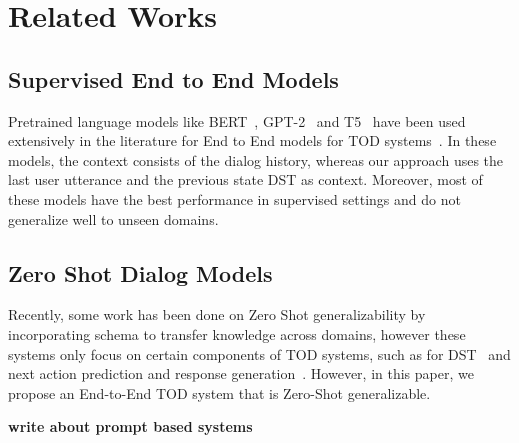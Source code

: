 \section{Related Works}



\subsection{Supervised End to End Models}
Pretrained language models like BERT~\cite{Devlin2019BERTPO}, GPT-2~\cite{Radford2019LanguageMA} and T5~\cite{Raffel2019ExploringTL}
have been used extensively in the literature for End to End models for TOD systems~\cite{HosseiniAsl2020ASL,Peng2021SoloistBT,Lee2020SUMBTLaRLEN,Yang2020UBARTF,Jeon2021DORATP,Sun2022BORTBA,Yang2022UBARv2TM,Noroozi2020AFA}.
In these models, the context consists of the dialog history, whereas our approach uses the last user utterance and the previous state DST as context.
Moreover, most of these models have the best performance in supervised settings and do not generalize well to unseen domains.

\subsection{Zero Shot Dialog Models}

Recently, some work has been done on Zero Shot generalizability by incorporating schema to transfer knowledge across domains, however these systems
only focus on certain components of TOD systems, such as for DST~\cite{Feng2020ASA,Feng2022DynamicSG,Lee2021DialogueST,Noroozi2020AFA,Wang2022SlotDM}
and next action prediction and response generation~\cite{Mosig2020STARAS,Mehri2021SchemaGuidedPF}.
However, in this paper, we propose an End-to-End TOD system that is Zero-Shot generalizable.

\textbf{write about prompt based systems}

